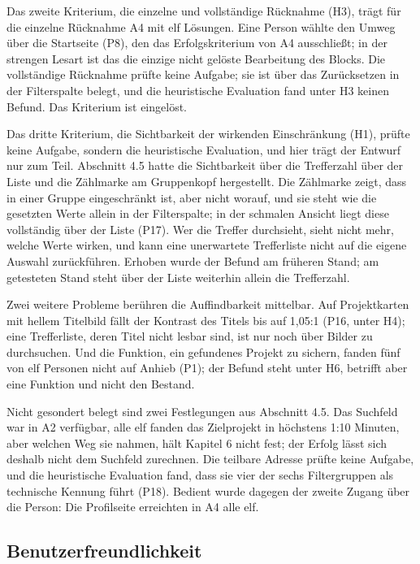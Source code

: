 Das zweite Kriterium, die einzelne und vollständige Rücknahme (H3), trägt für die einzelne Rücknahme A4 mit elf Lösungen. Eine Person wählte den Umweg über die Startseite (P8), den das Erfolgskriterium von A4 ausschließt; in der strengen Lesart ist das die einzige nicht gelöste Bearbeitung des Blocks. Die vollständige Rücknahme prüfte keine Aufgabe; sie ist über das Zurücksetzen in der Filterspalte belegt, und die heuristische Evaluation fand unter H3 keinen Befund. Das Kriterium ist eingelöst.

Das dritte Kriterium, die Sichtbarkeit der wirkenden Einschränkung (H1), prüfte keine Aufgabe, sondern die heuristische Evaluation, und hier trägt der Entwurf nur zum Teil. Abschnitt 4.5 hatte die Sichtbarkeit über die Trefferzahl über der Liste und die Zählmarke am Gruppenkopf hergestellt. Die Zählmarke zeigt, dass in einer Gruppe eingeschränkt ist, aber nicht worauf, und sie steht wie die gesetzten Werte allein in der Filterspalte; in der schmalen Ansicht liegt diese vollständig über der Liste (P17). Wer die Treffer durchsieht, sieht nicht mehr, welche Werte wirken, und kann eine unerwartete Trefferliste nicht auf die eigene Auswahl zurückführen. Erhoben wurde der Befund am früheren Stand; am getesteten Stand steht über der Liste weiterhin allein die Trefferzahl.

Zwei weitere Probleme berühren die Auffindbarkeit mittelbar. Auf Projektkarten mit hellem Titelbild fällt der Kontrast des Titels bis auf 1,05:1 (P16, unter H4); eine Trefferliste, deren Titel nicht lesbar sind, ist nur noch über Bilder zu durchsuchen. Und die Funktion, ein gefundenes Projekt zu sichern, fanden fünf von elf Personen nicht auf Anhieb (P1); der Befund steht unter H6, betrifft aber eine Funktion und nicht den Bestand.

Nicht gesondert belegt sind zwei Festlegungen aus Abschnitt 4.5. Das Suchfeld war in A2 verfügbar, alle elf fanden das Zielprojekt in höchstens 1:10 Minuten, aber welchen Weg sie nahmen, hält Kapitel 6 nicht fest; der Erfolg lässt sich deshalb nicht dem Suchfeld zurechnen. Die teilbare Adresse prüfte keine Aufgabe, und die heuristische Evaluation fand, dass sie vier der sechs Filtergruppen als technische Kennung führt (P18). Bedient wurde dagegen der zweite Zugang über die Person: Die Profilseite erreichten in A4 alle elf.

\subsection{Benutzerfreundlichkeit}


